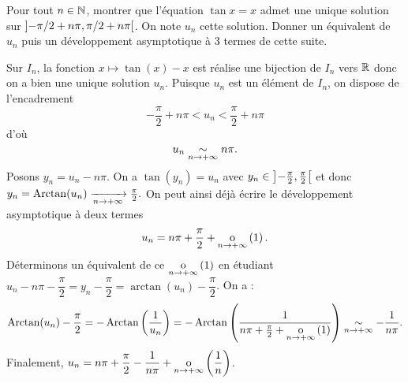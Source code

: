 \documentclass{magnoliaold}
\begin{document}
\begin{exoUnique}
  \exo Pour tout $n\in\mathbb{N}$, montrer que l'équation $\tan x=x$ admet une unique
    solution sur $\left]-\pi/2+n\pi,\pi/2+n\pi\right[$. On note $u_n$ cette solution.
    Donner un équivalent de $u_n$ puis un développement asymptotique à 3 termes
    de cette suite.
    \begin{sol}
    Sur $I_n$, la fonction $x\mapsto \tan(x)-x$ est réalise une bijection de $I_n$ vers $\mathbb{R}$ donc on a bien une unique solution $u_n$.
    Puisque $u_n$ est un élément de $I_n$, on dispose de l'encadrement $$-\frac{\pi}{2}+n\pi < u_n < \frac{\pi}{2}+n\pi$$ d'où $$u_n\underset{n\rightarrow +\infty}{\sim}n\pi.$$
    Posons $y_n=u_n-n\pi$. On a $\tan(y_n)=u_n$ avec $y_n \in \left]-\frac{\pi}{2},\frac{\pi}{2}\right[$ et donc $y_n=\operatorname{Arctan}(u_n)\xrightarrow[n\rightarrow +\infty]{}\frac{\pi}{2}.$ On peut ainsi déjà écrire le développement asymptotique à deux termes $$u_n=n\pi +\frac{\pi}{2}+\underset{n \rightarrow +\infty}{\text{o}}\left(1\right).$$ Déterminons un équivalent de ce $\underset{n \rightarrow +\infty}{\text{o}}\left(1\right)$ en étudiant $u_n-n\pi-\dfrac{\pi}{2}=y_n-\dfrac{\pi}{2}=\arctan(u_n)-\dfrac{\pi}{2}$. On a :
    $$\operatorname{Arctan}(u_n)-\frac{\pi}{2}=-\operatorname{Arctan}\left(\frac{1}{u_n}\right)=-\operatorname{Arctan}\left(\frac{1}{n\pi +\frac{\pi}{2}+\underset{n \rightarrow +\infty}{\text{o}}\left(1\right)}\right)\underset{n\rightarrow +\infty}{\sim}-\frac{1}{n\pi}.$$
    Finalement, $u_n=n\pi+\dfrac{\pi}{2}-\dfrac{1}{n\pi}+\underset{n \rightarrow +\infty}{\text{o}}\left(\dfrac{1}{n}\right)$.
    \end{sol}
  \end{exoUnique}




\end{document}
